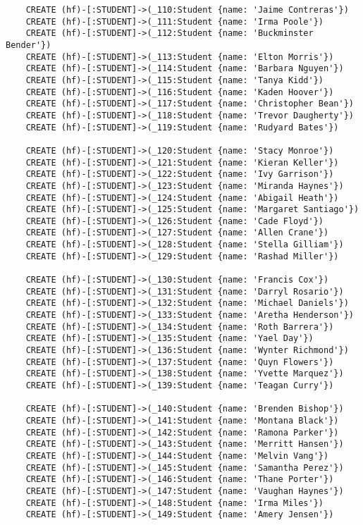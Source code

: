 \begin{lstlisting}
	CREATE (hf)-[:STUDENT]->(_110:Student {name: 'Jaime Contreras'})
	CREATE (hf)-[:STUDENT]->(_111:Student {name: 'Irma Poole'})
	CREATE (hf)-[:STUDENT]->(_112:Student {name: 'Buckminster Bender'})
	CREATE (hf)-[:STUDENT]->(_113:Student {name: 'Elton Morris'})
	CREATE (hf)-[:STUDENT]->(_114:Student {name: 'Barbara Nguyen'})
	CREATE (hf)-[:STUDENT]->(_115:Student {name: 'Tanya Kidd'})
	CREATE (hf)-[:STUDENT]->(_116:Student {name: 'Kaden Hoover'})
	CREATE (hf)-[:STUDENT]->(_117:Student {name: 'Christopher Bean'})
	CREATE (hf)-[:STUDENT]->(_118:Student {name: 'Trevor Daugherty'})
	CREATE (hf)-[:STUDENT]->(_119:Student {name: 'Rudyard Bates'})
	
	CREATE (hf)-[:STUDENT]->(_120:Student {name: 'Stacy Monroe'})
	CREATE (hf)-[:STUDENT]->(_121:Student {name: 'Kieran Keller'})
	CREATE (hf)-[:STUDENT]->(_122:Student {name: 'Ivy Garrison'})
	CREATE (hf)-[:STUDENT]->(_123:Student {name: 'Miranda Haynes'})
	CREATE (hf)-[:STUDENT]->(_124:Student {name: 'Abigail Heath'})
	CREATE (hf)-[:STUDENT]->(_125:Student {name: 'Margaret Santiago'})
	CREATE (hf)-[:STUDENT]->(_126:Student {name: 'Cade Floyd'})
	CREATE (hf)-[:STUDENT]->(_127:Student {name: 'Allen Crane'})
	CREATE (hf)-[:STUDENT]->(_128:Student {name: 'Stella Gilliam'})
	CREATE (hf)-[:STUDENT]->(_129:Student {name: 'Rashad Miller'})
	
	CREATE (hf)-[:STUDENT]->(_130:Student {name: 'Francis Cox'})
	CREATE (hf)-[:STUDENT]->(_131:Student {name: 'Darryl Rosario'})
	CREATE (hf)-[:STUDENT]->(_132:Student {name: 'Michael Daniels'})
	CREATE (hf)-[:STUDENT]->(_133:Student {name: 'Aretha Henderson'})
	CREATE (hf)-[:STUDENT]->(_134:Student {name: 'Roth Barrera'})
	CREATE (hf)-[:STUDENT]->(_135:Student {name: 'Yael Day'})
	CREATE (hf)-[:STUDENT]->(_136:Student {name: 'Wynter Richmond'})
	CREATE (hf)-[:STUDENT]->(_137:Student {name: 'Quyn Flowers'})
	CREATE (hf)-[:STUDENT]->(_138:Student {name: 'Yvette Marquez'})
	CREATE (hf)-[:STUDENT]->(_139:Student {name: 'Teagan Curry'})
	
	CREATE (hf)-[:STUDENT]->(_140:Student {name: 'Brenden Bishop'})
	CREATE (hf)-[:STUDENT]->(_141:Student {name: 'Montana Black'})
	CREATE (hf)-[:STUDENT]->(_142:Student {name: 'Ramona Parker'})
	CREATE (hf)-[:STUDENT]->(_143:Student {name: 'Merritt Hansen'})
	CREATE (hf)-[:STUDENT]->(_144:Student {name: 'Melvin Vang'})
	CREATE (hf)-[:STUDENT]->(_145:Student {name: 'Samantha Perez'})
	CREATE (hf)-[:STUDENT]->(_146:Student {name: 'Thane Porter'})
	CREATE (hf)-[:STUDENT]->(_147:Student {name: 'Vaughan Haynes'})
	CREATE (hf)-[:STUDENT]->(_148:Student {name: 'Irma Miles'})
	CREATE (hf)-[:STUDENT]->(_149:Student {name: 'Amery Jensen'})
	

\end{lstlisting}
